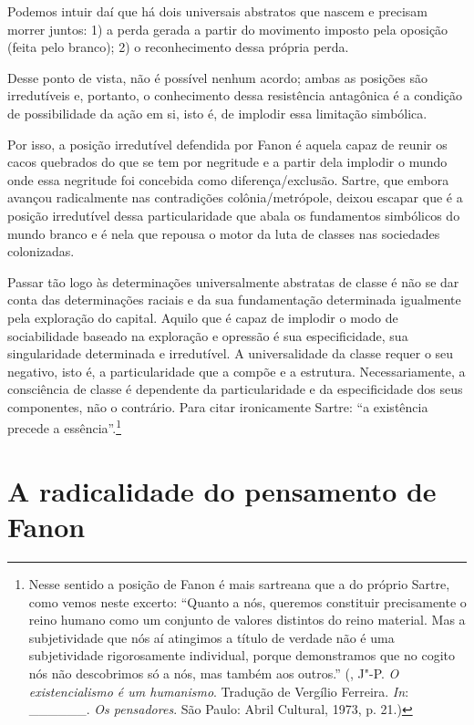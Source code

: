 Podemos intuir daí que há dois universais abstratos que nascem e
precisam morrer juntos: 1) a perda gerada a partir do movimento imposto
pela oposição (feita pelo branco); 2) o reconhecimento dessa própria
perda.

Desse ponto de vista, não é possível nenhum acordo; ambas as posições
são irredutíveis e, portanto, o conhecimento dessa resistência
antagônica é a condição de possibilidade da ação em si, isto é, de
implodir essa limitação simbólica.

Por isso, a posição irredutível defendida por Fanon é aquela capaz de
reunir os cacos quebrados do que se tem por negritude e a partir dela
implodir o mundo onde essa negritude foi concebida como
diferença/exclusão. Sartre, que embora avançou radicalmente nas
contradições colônia/metrópole, deixou escapar que é a posição
irredutível dessa particularidade que abala os fundamentos simbólicos do
mundo branco e é nela que repousa o motor da luta de classes nas
sociedades colonizadas.

Passar tão logo às determinações universalmente abstratas de classe é
não se dar conta das determinações raciais e da sua fundamentação
determinada igualmente pela exploração do capital. Aquilo que é capaz de
implodir o modo de sociabilidade baseado na exploração e opressão é sua
especificidade, sua singularidade determinada e irredutível. A
universalidade da classe requer o seu negativo, isto é, a
particularidade que a compõe e a estrutura. Necessariamente, a
consciência de classe é dependente da particularidade e da
especificidade dos seus componentes, não o contrário. Para citar
ironicamente Sartre: ``a existência precede a essência''.\footnote{Nesse
  sentido a posição de Fanon é mais sartreana que a do próprio Sartre,
  como vemos neste excerto: ``Quanto a nós, queremos constituir
  precisamente o reino humano como um conjunto de valores distintos do
  reino material. Mas a subjetividade que nós aí atingimos a título de
  verdade não é uma subjetividade rigorosamente individual, porque
  demonstramos que no cogito nós não descobrimos só a nós, mas também
  aos outros.'' (, J"-P. \emph{O existencialismo é um humanismo}.
  Tradução de Vergílio Ferreira. \emph{In}: \_\_\_\_\_\_. \emph{Os
  pensadores}. São Paulo: Abril Cultural, 1973, p. 21.)}

\chapter{A radicalidade do pensamento de Fanon}

